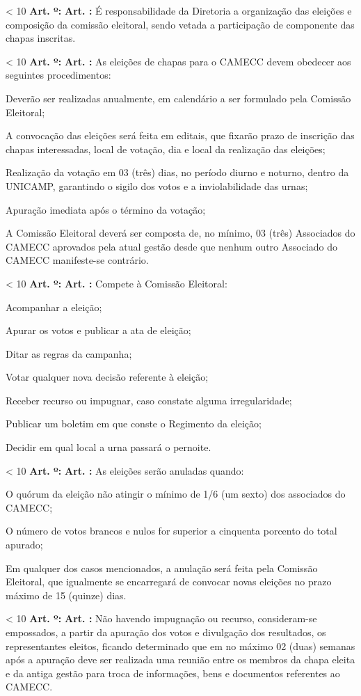 \documentclass[capitulo]{br-lex}
\newcounter{chap}
\newcounter{art}
\renewcommand{\artigo}{
    \ifnum\value{art} < 10
        \textbf{Art. \arabic{art}º:}
    \else
        \textbf{Art. \arabic{art}:}
    \fi
    \stepcounter{art}
    \setcounter{inciso}{0}
    \setcounter{paragrafo}{0}
}
\begin{document}
\artigo É responsabilidade da Diretoria a organização das eleições e composição da comissão eleitoral, sendo vetada a participação de componente das chapas inscritas.

\artigo As eleições de chapas para o CAMECC devem obedecer aos seguintes procedimentos:

\inciso Deverão ser realizadas anualmente, em calendário a ser formulado pela Comissão Eleitoral;

\inciso A convocação das eleições será feita em editais, que fixarão prazo de inscrição das chapas interessadas, local de votação, dia e local da realização das eleições;

\inciso Realização da votação em 03 (três) dias, no período diurno e noturno, dentro da UNICAMP, garantindo o sigilo dos votos e a inviolabilidade das urnas;

\inciso Apuração imediata após o término da votação;

\inciso A Comissão Eleitoral deverá ser composta de, no mínimo, 03 (três) Associados do CAMECC aprovados pela atual gestão desde que nenhum outro Associado do CAMECC manifeste-se contrário.

\artigo Compete à Comissão Eleitoral:

\inciso Acompanhar a eleição;

\inciso Apurar os votos e publicar a ata de eleição;

\inciso Ditar as regras da campanha;

\inciso Votar qualquer nova decisão referente à eleição;

\inciso Receber recurso ou impugnar, caso constate alguma irregularidade;

\inciso Publicar um boletim em que conste o Regimento da eleição;

\inciso Decidir em qual local a urna passará o pernoite.

\artigo As eleições serão anuladas quando:

\inciso O quórum da eleição não atingir o mínimo de 1/6 (um sexto) dos associados do CAMECC;

\inciso O número de votos brancos e nulos for superior a cinquenta porcento do total apurado;

\paragrafounico Em qualquer dos casos mencionados, a anulação será feita pela Comissão Eleitoral, que igualmente se encarregará de convocar novas eleições no prazo máximo de 15 (quinze) dias.

\artigo Não havendo impugnação ou recurso, consideram-se empossados, a partir da apuração dos votos e divulgação dos resultados, os representantes eleitos, ficando determinado que em no máximo 02 (duas) semanas após a apuração deve ser realizada uma reunião entre os membros da chapa eleita e da antiga gestão para troca de informações, bens e documentos referentes ao CAMECC.
\end{document}
